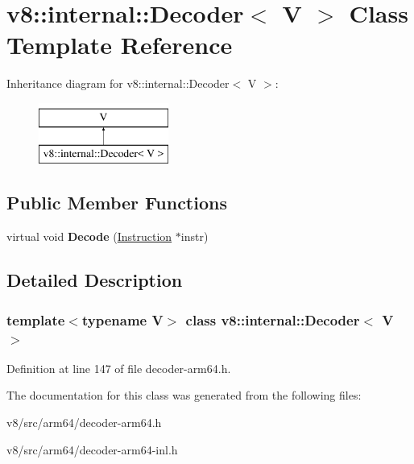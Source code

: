 \hypertarget{classv8_1_1internal_1_1Decoder}{}\section{v8\+:\+:internal\+:\+:Decoder$<$ V $>$ Class Template Reference}
\label{classv8_1_1internal_1_1Decoder}
Inheritance diagram for v8\+:\+:internal\+:\+:Decoder$<$ V $>$\+:\begin{figure}[H]
\begin{center}
\leavevmode
\includegraphics[height=2.000000cm]{classv8_1_1internal_1_1Decoder}
\end{center}
\end{figure}
\subsection*{Public Member Functions}
\begin{DoxyCompactItemize}
\item 
\mbox{\label{classv8_1_1internal_1_1Decoder_a8981c25a9530bdbe6b44f21c96a7be22}} 
virtual void {\bfseries Decode} (\mbox{\hyperlink{classv8_1_1internal_1_1Instruction}{Instruction}} $\ast$instr)
\end{DoxyCompactItemize}


\subsection{Detailed Description}
\subsubsection*{template$<$typename V$>$\newline
class v8\+::internal\+::\+Decoder$<$ V $>$}



Definition at line 147 of file decoder-\/arm64.\+h.



The documentation for this class was generated from the following files\+:\begin{DoxyCompactItemize}
\item 
v8/src/arm64/decoder-\/arm64.\+h\item 
v8/src/arm64/decoder-\/arm64-\/inl.\+h\end{DoxyCompactItemize}
